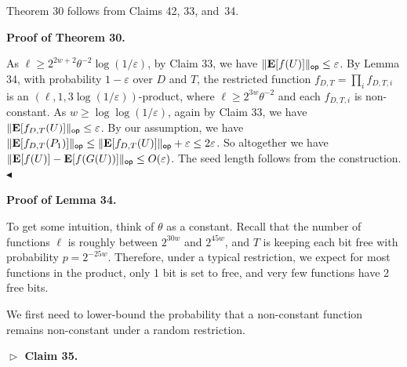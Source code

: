 


Theorem 30 follows from Claims 42, 33, and 34.\par




\par\medskip\noindent\textbf{Proof of Theorem 30.}\par




As $\ell\geq 2^{2w+2}\theta^{-2}\log(1/\varepsilon)$, by Claim 33, we have $\lVert\mathop{\bf E\/}[f(U)]\rVert_{\mathsf{op}}\leq\varepsilon$.
By Lemma 34, with probability $1-\varepsilon$ over $D$ and $T$, the restricted function $f_{D,T}=\prod_{i}f_{D,T,i}$ is an $(\ell,1,3\log(1/\varepsilon))$-product, where $\ell\geq 2^{3w}\theta^{-2}$ and each $f_{D,T,i}$ is non-constant.
As $w\geq\log\log(1/\varepsilon)$, again by Claim 33, we have $\lVert\mathop{\bf E\/}[f_{D,T}(U)]\rVert_{\mathsf{op}}\leq\varepsilon$.
By our assumption, we have $\lVert\mathop{\bf E\/}[f_{D,T}(P_{1})]\rVert_{\mathsf{op}}\leq\lVert\mathop{\bf E\/}[f_{D,T}(U)]\rVert_{\mathsf{op}}+\varepsilon\leq 2\varepsilon$.
So altogether we have $\lVert\mathop{\bf E\/}[f(U)]-\mathop{\bf E\/}[f(G(U))]\rVert_{\mathsf{op}}\leq
O(\varepsilon)$.
The seed length follows from the construction.
$\blacktriangleleft$\par





\par\medskip\noindent\textbf{Proof of Lemma 34.}\par




To get some intuition, think of $\theta$ as a constant.
Recall that the number of functions $\ell$ is roughly between $2^{30w}$ and $2^{45w}$, and $T$ is keeping each bit free with probability $p=2^{-25w}$.
Therefore, under a typical restriction, we expect for most functions in the product, only 1 bit is set to free, and very few functions have 2 free bits.\par




We first need to lower-bound the probability that a non-constant function remains non-constant under a random restriction.\par





\par\medskip\noindent\textbf{
$\vartriangleright$ Claim 35. }\par



